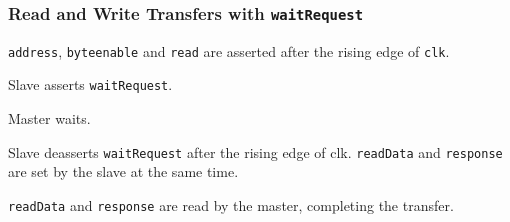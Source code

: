 		\subsubsection{Read and Write Transfers with \texttt{waitRequest}  }	
			\begin{multicols}{2}
				\begin{compactenum}
					\item \texttt{address}, \texttt{byteenable} and \texttt{read} are asserted after the rising edge of \texttt{clk}.
					\item Slave asserts \texttt{waitRequest}.
					\item Master waits.
					\item Slave deasserts \texttt{waitRequest} after the rising edge of clk. \texttt{readData} and \texttt{response} are set by the slave at the same time.
					\item \texttt{readData} and \texttt{response} are read by the master, completing the transfer.
					  

\end{compactenum}
\end{multicols}
